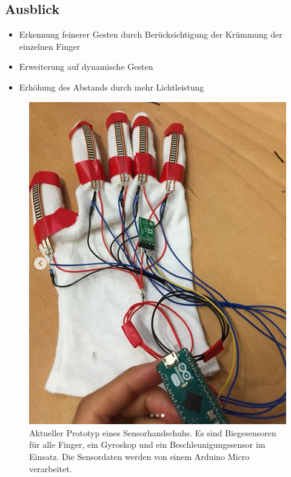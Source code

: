 \documentclass{sciposter}
\begin{document}
\begin{multicols}{3}

\section{Ausblick}
\noindent

\begin{itemize}
	\item Erkennung feinerer Gesten durch Berücksichtigung der Krümmung der einzelnen Finger
	\item Erweiterung auf dynamische Gesten
	\item Erhöhung des Abstands durch mehr Lichtleistung
\end{itemize}

\begin{figure}[h]
	\centering
	\includegraphics[scale=1.4]{../figures/Sensorhandschuh}
	\caption{Aktueller Prototyp eines Sensorhandschuhs. Es sind Biegesensoren für alle Finger, ein Gyroskop und ein Beschleunigungssensor im Einsatz. Die Sensordaten werden von einem Arduino Micro verarbeitet.}
	\label{fig:Sensorhandschuh}
\end{figure}


\end{multicols}
\end{document}
